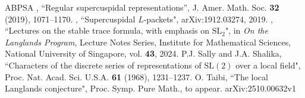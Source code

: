 \documentclass[11pt]{amsart}
\numberwithin{equation}{section}
\def\SL{\mathrm{SL}}
\newcommand{\<}{\left\langle}
\renewcommand{\>}{\right\rangle}
\begin{document}
\begin{thebibliography}{ABPSA}
 \bysame, ``Regular supercuspidal representations'', J. Amer. Math. Soc. \textbf{32} (2019), 1071--1170.
 \bysame, ``Supercuspidal $L$-packets",  arXiv:1912.03274, 2019. 
 \bysame, ``Lectures on the stable trace formula, with emphasis on $\SL_2$", in \textit{On the Langlands Program}, Lecture Notes Series, Institute for Mathematical Sciences, National University of Singapore, vol. \textbf{43}, 2024.
 P.J. Sally and J.A. Shalika,  ``Characters of the discrete series of representations of $\SL(2)$ over a local field", Proc. Nat. Acad. Sci. U.S.A. \textbf{61} (1968), 1231--1237.   
 O. Taibi, ``The local Langlands conjecture", Proc. Symp. Pure Math., to appear.  arXiv:2510.00632v1
\end{thebibliography}
\end{document}
